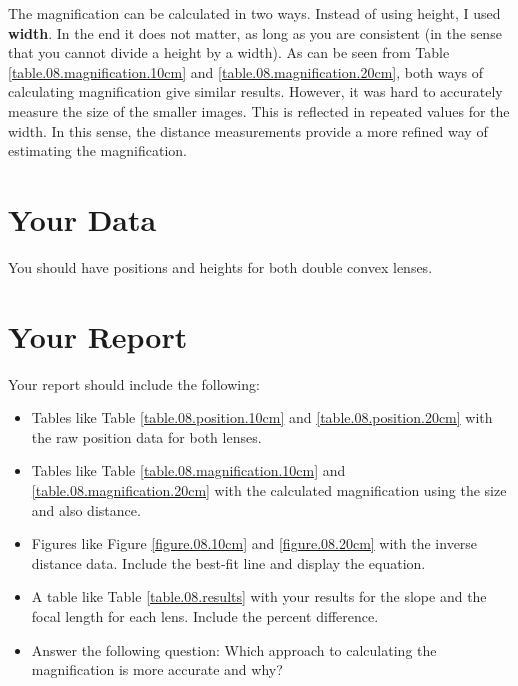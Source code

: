 The magnification can be calculated in two ways. Instead of using height, I used \textbf{width}. In the end it does not matter, as long as you are consistent (in the sense that you cannot divide a height by a width). As can be seen from Table \ref{table.08.magnification.10cm} and \ref{table.08.magnification.20cm}, both ways of calculating magnification give similar results. However, it was hard to accurately measure the size of the smaller images. This is reflected in repeated values for the width. In this sense, the distance measurements provide a more refined way of estimating the magnification.
\section{Your Data}
You should have positions and heights for both double convex lenses.
\newpage
\section{Your Report}
Your report should include the following:
\begin{itemize}
    \item Tables like Table \ref{table.08.position.10cm} and \ref{table.08.position.20cm} with the raw position data for both lenses.
    \item Tables like Table \ref{table.08.magnification.10cm} and \ref{table.08.magnification.20cm} with the calculated magnification using the size and also distance.
    \item Figures like Figure \ref{figure.08.10cm} and \ref{figure.08.20cm} with the inverse distance data. Include the best-fit line and display the equation.
    \item A table like Table \ref{table.08.results} with your results for the slope and the focal length for each lens. Include the percent difference.
    \item Answer the following question: Which approach to calculating the magnification is more accurate and why?
\end{itemize}
\newpage
